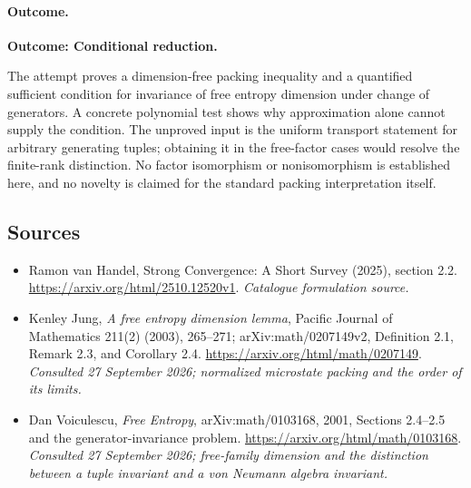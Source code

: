 \documentclass[11pt,a4paper]{article}
\numberwithin{equation}{section}
\begin{document}
\paragraph{Outcome.}
\textbf{Outcome: Conditional reduction.}

The attempt proves a dimension-free packing inequality and a quantified
sufficient condition for invariance of free entropy dimension under change
of generators. A concrete polynomial test shows why approximation alone
cannot supply the condition. The unproved input is the uniform transport
statement for arbitrary generating tuples; obtaining it in the free-factor
cases would resolve the finite-rank distinction. No factor isomorphism or
nonisomorphism is established here, and no novelty is claimed for the
standard packing interpretation itself.
\subsection{Sources}
\begin{itemize}\raggedright
\item[\textnormal{[S1]}]\hypertarget{source:174:1}{} Ramon van Handel, Strong Convergence: A Short Survey (2025), section 2.2.
\url{https://arxiv.org/html/2510.12520v1}.
{\small\textit{Catalogue formulation source.}}
\item[\textnormal{[E1]}]\hypertarget{extra:174:1}{} Kenley Jung,
\emph{A free entropy dimension lemma}, Pacific Journal of Mathematics
211(2) (2003), 265--271; arXiv:math/0207149v2,
Definition 2.1, Remark 2.3, and Corollary 2.4.
\url{https://arxiv.org/html/math/0207149}.
{\small\textit{Consulted 27 September 2026; normalized microstate packing
and the order of its limits.}}
\item[\textnormal{[E2]}]\hypertarget{extra:174:2}{} Dan Voiculescu,
\emph{Free Entropy}, arXiv:math/0103168, 2001,
Sections 2.4--2.5 and the generator-invariance problem.
\url{https://arxiv.org/html/math/0103168}.
{\small\textit{Consulted 27 September 2026; free-family dimension and the
distinction between a tuple invariant and a von Neumann algebra invariant.}}
\end{itemize}
\end{document}
